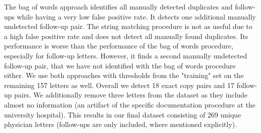 The bag of words approach identifies all manually detected duplicates and follow-ups while having a very low false positive rate. It detects one additional manually undetected follow-up pair. The string matching procedure is not as useful due to a high false positive rate and does not detect all manually found duplicates. Its performance is worse than the performance of the bag of words procedure, especially for follow-up letters. However, it finds a second manually undetected follow-up pair, that we have not identified with the bag of words procedure either. We use both approaches with thresholds from the "training" set on the remaining 157 letters as well. Overall we detect 18 exact copy pairs and 17 follow-up pairs. We additionally remove three letters from the dataset as they include almost no information (an artifact of the specific documentation procedure at the university hospital). This results in our final dataset consisting of 269 unique physician letters (follow-ups are only included, where mentioned explicitly).






